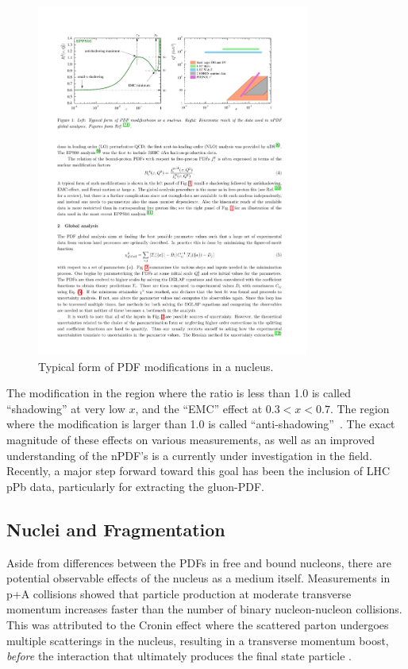 \begin{figure}[htpb]
  \centering
  \includegraphics[width=0.8\textwidth]{Introduction/cnm_cartoon}
  \caption{Typical form of PDF modifications in a nucleus\cite{Pumplin2001}.}
  \label{fig:cnm_cartoon}
\end{figure}

The modification in the region where the ratio is less than 1.0 is called ``shadowing'' at very low $x$, and the ``EMC'' effect at  $0.3 < x < 0.7$. The region where the modification is larger than 1.0 is called ``anti-shadowing''~\cite{Pumplin2001}. The exact magnitude of these effects on various measurements, as well as an improved understanding of the nPDF's is a currently under investigation in the field. Recently, a major step forward toward this goal has been the inclusion of LHC pPb data, particularly for extracting the gluon-PDF.
\subsection{Nuclei and Fragmentation}

Aside from differences between the PDFs in free and bound nucleons, there are potential observable effects of the nucleus as a medium itself. Measurements in p+A collisions showed that particle production at moderate transverse momentum increases faster than the number of binary nucleon-nucleon collisions. This was attributed to the Cronin effect where the scattered parton undergoes multiple scatterings in the nucleus, resulting in a transverse momentum boost, \textit{before} the interaction that ultimately produces the final state particle \cite{Cronin1975}.

